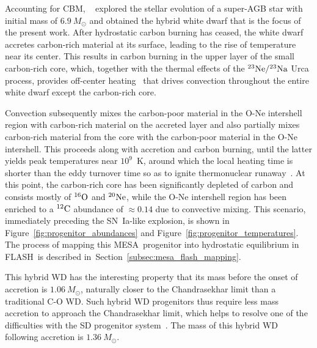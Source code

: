 \documentclass[iop,apj]{emulateapj}
\newcommand{\figref}[1]{Figure~\ref{#1}}
\newcommand{\secref}[1]{Section~\ref{#1}}
\newcommand{\SNIa}{SN~Ia}
\newcommand{\C}[1]{\ensuremath{{}^{#1}{\rm C}}}
\newcommand{\Ox}[1]{\ensuremath{{}^{#1}{\rm O}}}
\newcommand{\Ne}[1]{\ensuremath{{}^{#1}{\rm Ne}}}
\newcommand{\Na}[1]{\ensuremath{{}^{#1}{\rm Na}}}
\newcommand{\code}[1]{\textsc{#1}}
\newcommand{\FLASH}{\code{FLASH}}
\newcommand{\MESA}{\code{MESA}}
\newcommand{\unitstyle}[1]{\ensuremath{\mathrm{#1}}}
\newcommand{\Kelvin}{\unitstyle{K}}
\newcommand{\K}{\Kelvin}  %
\newcommand{\Msun}{\ensuremath{M_\odot}}
\begin{document}
Accounting for CBM, ~\citet{denissenkovetal2015} explored
the stellar evolution of a super-AGB star with initial mass of
$6.9~\Msun$ and obtained the hybrid white dwarf that is the focus of
the present work. After hydrostatic carbon burning has ceased, the
white dwarf accretes carbon-rich material at its surface, leading to
the rise of temperature near its center. This results in carbon
burning in the upper layer of the small carbon-rich core, which,
together with the thermal effects of the $\Ne{23}/\Na{23}$ Urca process,
provides off-center heating~\citep{denissenkovetal2015} that drives
convection throughout the entire white dwarf except the carbon-rich
core.

Convection subsequently mixes the carbon-poor material in the
O-Ne intershell region with carbon-rich material on the accreted layer
and also partially mixes carbon-rich material from the core with the
carbon-poor material in the O-Ne intershell. This proceeds along with
accretion and carbon burning, until the latter yields peak
temperatures near $10^9$~\K, around which the local heating time is
shorter than the eddy turnover time so as to ignite thermonuclear
runaway~\citep{wunschwoosley2004}. At this point, the carbon-rich core
has been significantly depleted of carbon and consists mostly of
\Ox{16} and \Ne{20}, while the O-Ne intershell region has been
enriched to a \C{12} abundance of $\approx 0.14$ due to convective
mixing. This scenario, immediately preceding the \SNIa-like explosion,
is shown in \figref{fig:progenitor_abundances} and
\figref{fig:progenitor_temperatures}.  The process of mapping this
\MESA\ progenitor into hydrostatic equilibrium in \FLASH\ is described
in~\secref{subsec:mesa_flash_mapping}.  

This hybrid WD has the interesting property that its mass before the
onset of accretion is $1.06~\Msun$, naturally closer to the
Chandrasekhar limit than a traditional C-O WD. Such
hybrid WD progenitors thus require less mass accretion to approach
the Chandrasekhar limit, which helps to resolve one of the
difficulties with the SD progenitor
system~\citep{denissenkovetal2015,chenetal2014,kromeretal2015}. The
mass of this hybrid WD following accretion is $1.36~\Msun$.
\end{document}
